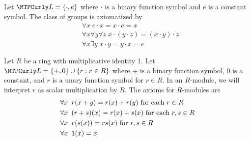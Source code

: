\documentclass[11pt]{article}
\begin{document}
\begin{examplle}[Groups]
Let \(\call=\{\cdot,e\}\) where \(\cdot\) is a binary function symbol and \(e\) is a 
constant symbol. The class of groups is axiomatized by
\begin{align*}
&\forall x\;e\cdot x=x\cdot e=x\\
&\forall x\forall y\forall z\;x\cdot(y\cdot z)=(x\cdot y)\cdot z\\
&\forall x\exists y\;x\cdot y=y\cdot x= e
\end{align*}
\end{examplle}

\begin{examplle}
Let \(R\) be a ring with multiplicative identity 1. Let
\(\call=\{+,0\}\cup\{r:r\in R\}\) where \(+\) is a binary function symbol, 0 is a
constant, and \(r\) is a unary function symbol for \(r\in R\). In an
\(R\)-module, we will interpret \(r\) as scalar multiplication by \(R\). The
axioms for \(R\)-modules are
\begin{align*}
&\forall x\enspace r(x+y)=r(x)+r(y)\text{ for each }r\in R\\
&\forall x\enspace (r+s)(x)=r(x)+s(x)\text{ for each }r,s\in R\\
&\forall x\enspace r(s(x))=rs(x)\text{ for } r,s\in R\\
&\forall x\enspace 1(x)=x
\end{align*}
\end{examplle}
\end{document}
